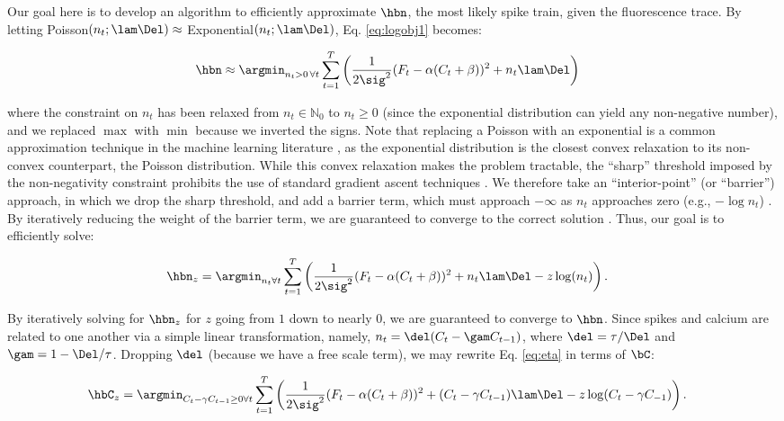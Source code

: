 Our goal here is to develop an algorithm to efficiently approximate $\hbn$, the most likely spike train, given the fluorescence trace. By letting Poisson$(n_t; \lam\Del) \approx$ Exponential$(n_t; \lam\Del)$, Eq. \eqref{eq:logobj1} becomes:

\begin{align} \label{eq:obj2}
\hbn &\approx \argmin_{n_t>0 \, \forall t}  \sum_{t=1}^T \bigg( \frac{1}{2 \sig^2}(F_t - \alpha(C_t + \beta))^2  + n_t \lam \Del \bigg) 
\end{align}

\noindent where the constraint on $n_t$ has been relaxed from  $n_t \in \mathbb{N}_0$ to $n_t \geq 0$ (since the exponential distribution can yield any non-negative number), and we replaced $\max$ with $\min$ because we inverted the signs.  Note that replacing a Poisson with an exponential is a common approximation technique in the machine learning literature \cite{TBF01}, as the exponential distribution is the closest convex relaxation to its non-convex counterpart, the Poisson distribution. While this convex relaxation makes the problem tractable, the ``sharp'' threshold imposed by the non-negativity constraint prohibits the use of standard gradient ascent techniques \cite{CONV04}. We therefore take an ``interior-point'' (or ``barrier'') approach, in which we drop the sharp threshold, and add a barrier term, which must approach $-\infty$ as $n_t$ approaches zero (e.g., $-\log n_t$) \cite{CONV04}.  By iteratively reducing the weight of the barrier term, we are guaranteed to converge to the correct solution \cite{CONV04}.  Thus, our goal is to efficiently solve:

\begin{align} \label{eq:eta}
\hbn_{\zzz} &= \argmin_{n_t \forall t}  \sum_{t=1}^T \left( \frac{1}{2 \sig^2}(F_t - \alpha(C_t + \beta))^2  +  n_t  \lam \Del - \zzz \log(n_t) \right).
\end{align}

\noindent By iteratively solving for $\hbn_{\zzz}$ for $z$ going from $1$ down to nearly $0$, we are guaranteed to converge to $\hbn$. Since spikes and calcium are related to one another via a simple linear transformation, namely, $n_t= \del (C_t-\gam C_{t-1})$, where $\del=\tau/\Del$ and $\gam=1-\Del/\tau$.  Dropping $\del$ (because we have a free scale term), we may rewrite Eq. \eqref{eq:eta} in terms of $\bC$:

\begin{align} 
\hbC_{\zzz} &= \argmin_{C_t - \gamma C_{t-1} \geq 0 \forall t} \sum_{t=1}^{T} \left( \frac{1}{2 \sig^2} (F_t -\alpha (C_t + \beta))^2  + (C_t - \gamma C_{t-1}) \lam \Del - \zzz \log(C_t - \gamma C_{-1}) \right). \label{eq:eta2}
\end{align}


